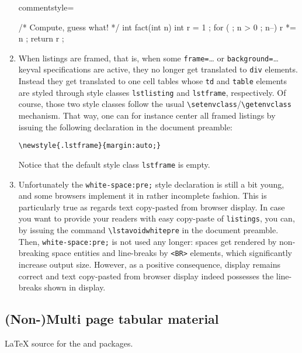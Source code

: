 \begin{enumerate}
{commentstyle={\em\color{magenta}}}%
{\lstset{language=C, style=colors}}
{}
\begin{clisting}
/* Compute, guess what! */
int fact(int n) {
  int r = 1 ;
  for ( ; n > 0 ; n--) {
    r *= n ;
  }
  return r ;
}
\end{clisting}
\endgroup\fi
\item When listings are framed, that is, when  some
\texttt{frame=}\ldots{} or \texttt{background=}\ldots{} keyval
specifications are active, they no longer get translated to \verb+div+
elements.
Instead they get translated to one cell tables whose \verb+td+
and \verb+table+ elements
are styled through style classes \texttt{lstlisting} and
\texttt{lstframe}, respectively. Of course, those two style classes
follow the usual \verb+\setenvclass+/\verb+\getenvclass+ mechanism.
That way, one can for instance center all framed listings by issuing
the following declaration in the document preamble:
\begin{verbatim}
\newstyle{.lstframe}{margin:auto;}
\end{verbatim}
Notice that the default style class \texttt{lstframe} is empty.

\item {}%
Unfortunately the \verb+white-space:pre;+ style declaration is still a
bit young, and some browsers implement it in rather incomplete
fashion.  This is particularly true as regards text copy-pasted from
browser display.  In case you want to provide your readers with easy
copy-paste of \texttt{listings}, you can, by issuing the command
\verb+\lstavoidwhitepre+ in the document preamble.  Then,
\verb+white-space:pre;+ is not used any longer: spaces get rendered
by non-breaking space entities and line-breaks by \verb+<BR>+ elements,
which significantly increase output size.  However, as a positive
consequence, display remains correct and text copy-pasted from browser
display indeed possesses the line-breaks shown in display.
\end{enumerate}


\subsection{(Non-)Multi page tabular material}
%
\ifhevea\LaTeX{} source
for the
and 
packages.\fi


